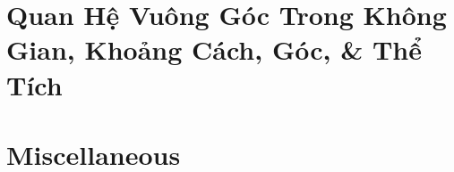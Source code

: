 \documentclass{article}
\begin{document}
\section{Quan Hệ Vuông Góc Trong Không Gian, Khoảng Cách, Góc, \& Thể Tích}


\section{Miscellaneous}


\printbibliography[heading=bibintoc]
	
\end{document}
